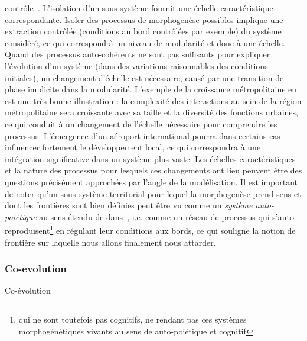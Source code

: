{contrôle~\cite{2017arXiv170105880W}. L'isolation d'un sous-système fournit une échelle caractéristique correspondante. Isoler des processus de morphogenèse possibles implique une extraction contrôlée (conditions au bord contrôlées par exemple) du système considéré, ce qui correspond à un niveau de modularité et donc à une échelle. Quand des processus auto-cohérents ne sont pas suffisants pour expliquer l'évolution d'un système (dans des variations raisonnables des conditions initiales), un changement d'échelle est nécessaire, causé par une transition de phase implicite dans la modularité. L'exemple de la croissance métropolitaine en est une très bonne illustration : la complexité des interactions au sein de la région métropolitaine sera croissante avec sa taille et la diversité des fonctions urbaines, ce qui conduit à un changement de l'échelle nécessaire pour comprendre les processus. L'émergence d'un aéroport international pourra dans certains cas influencer fortement le développement local, ce qui correspondra à une intégration significative dans un système plus vaste. Les échelles caractéristiques et la nature des processus pour lesquels ces changements ont lieu peuvent être des questions précisément approchées par l'angle de la modélisation. Il est important de noter qu'un sous-système territorial pour lequel la morphogenèse prend sens et dont les frontières sont bien définies peut être vu comme un \emph{système auto-poiétique} au sens étendu de  dans~\cite{bourgine2004autopoiesis}, i.e. comme un réseau de processus qui s'auto-reproduisent\footnote{qui ne sont toutefois pas cognitifs, ne rendant pas ces systèmes morphogénétiques vivants au sens de auto-poiétique et cognitif} en régulant leur conditions aux bords, ce qui souligne la notion de frontière sur laquelle nous allons finalement nous attarder.
}





\subsubsection{Co-evolution}{Co-évolution}



